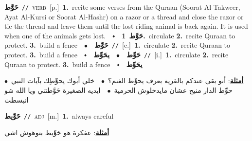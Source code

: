 \documentclass[10pt,a4paper,twoside]{article} %
\begin{document}
\begin{multicols}{2}
{\setlength\topsep{0pt}\textbf{\foreignlanguage{arabic}{حَوَّط}}\ {\color{gray}\texttt{//}\color{black}}\ \textsc{verb}\ [p.]\ \textbf{1.}~recite some verses from the Quraan (Soorat Al-Takweer, Ayat Al-Kursi or Soorat Al-Hashr) on a razor or a thread and close the razor or tie the thread and leave them until the lost riding animal is back again. It is used when one of the animals gets lost.\ \ $\smblkdiamond$\ \ \setlength\topsep{0pt}\textbf{\foreignlanguage{arabic}{حَوَّط}}\ \textbf{1.}~circulate  \textbf{2.}~recite Quraan to protect.  \textbf{3.}~build a fence\ \ $\bullet$\ \ \setlength\topsep{0pt}\textbf{\foreignlanguage{arabic}{حَوِّط}}\ {\color{gray}\texttt{//}\color{black}}\ [c.]\ \textbf{1.}~circulate  \textbf{2.}~recite Quraan to protect.  \textbf{3.}~build a fence\ \ $\smblkdiamond$\ \ \setlength\topsep{0pt}\textbf{\foreignlanguage{arabic}{حَوِّط}}\ \ $\bullet$\ \ \setlength\topsep{0pt}\textbf{\foreignlanguage{arabic}{يحَوِّط}}\ {\color{gray}\texttt{//}\color{black}}\ [i.]\ \textbf{1.}~circulate  \textbf{2.}~recite Quraan to protect.  \textbf{3.}~build a fence\ \ $\smblkdiamond$\ \ \setlength\topsep{0pt}\textbf{\foreignlanguage{arabic}{يحَوِّط}}\  \begin{flushright}\color{gray}\foreignlanguage{arabic}{\textbf{\underline{\foreignlanguage{arabic}{أمثلة}}}: أنو بقى عندكم بالقرية بعرف يحوِّط الغنم؟\ $\bullet$\ \  خلي أبوك يحوِّطِك بآيات النبي\ $\bullet$\ \  حوِّط الدار منيح عشان مايدخلوش الحرمية\ $\bullet$\ \  ايديه الصغيرة حَوَّطتني ويا الله شو انبسطت}\end{flushright}\color{black}} \vspace{2mm}

{\setlength\topsep{0pt}\textbf{\foreignlanguage{arabic}{حَوِّيط}}\ {\color{gray}\texttt{//}\color{black}}\ \textsc{adj}\ [m.]\ \textbf{1.}~always careful\  \begin{flushright}\color{gray}\foreignlanguage{arabic}{\textbf{\underline{\foreignlanguage{arabic}{أمثلة}}}: عفكرة هو حَوِّيط بتوهوش اشي}\end{flushright}\color{black}} \vspace{2mm}


\end{multicols}
\end{document}
